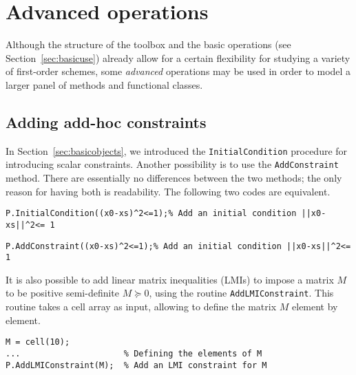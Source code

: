 \documentclass[11pt,a4paper]{article}
\begin{document}
					\section{Advanced operations}		%

					Although the structure of the toolbox and the basic operations (see Section~\ref{sec:basicuse}) already allow for a certain flexibility for studying a variety of first-order schemes, some \emph{advanced} operations may be used in order to model a larger panel of methods and functional classes.

					\subsection{Adding add-hoc constraints}\label{sec:constraints}
					In Section~\ref{sec:basicobjects}, we introduced the \verb?InitialCondition? procedure for introducing scalar constraints. Another possibility is to use the \verb?AddConstraint? method. There are essentially no differences between the two methods; the only reason for having both is readability. The following two codes are equivalent.\\[-1cm]
					\begin{lstlisting}
P.InitialCondition((x0-xs)^2<=1);% Add an initial condition ||x0-xs||^2<= 1
					\end{lstlisting}\vspace{-.5cm}
					\begin{lstlisting}
P.AddConstraint((x0-xs)^2<=1);% Add an initial condition ||x0-xs||^2<= 1
					\end{lstlisting}
					It is also possible to add linear matrix inequalities (LMIs) to impose a matrix $M$ to be positive semi-definite $M \succeq 0$, using the routine \verb?AddLMIConstraint?. This routine takes a cell array as input, allowing to define the matrix $M$ element by element. \\[-1cm] %
					\begin{lstlisting}
M = cell(10);
... 					% Defining the elements of M
P.AddLMIConstraint(M);	% Add an LMI constraint for M
					\end{lstlisting}
\end{document}
